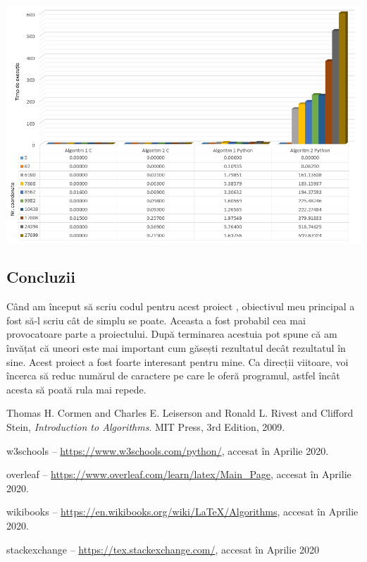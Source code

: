 \documentclass[11pt,a4paper]{article}
\begin{document}
\begin{center}
  \includegraphics[width=1\textwidth]{diagrama1.png} \\
\end{center}

    \subsection{Concluzii}
    Când am început să scriu codul pentru acest proiect , obiectivul meu principal a fost să-l scriu cât de simplu se poate. Aceasta a fost probabil cea mai provocatoare parte a proiectului. După terminarea acestuia pot spune că am învățat că uneori este mai important cum găsești rezultatul decât rezultatul în sine. Acest proiect a fost foarte interesant pentru mine. Ca direcții viitoare, voi  încerca să reduc numărul de caractere pe care le oferă programul, astfel încât acesta să poată rula mai repede.

\begin{thebibliography}{9}

	  Thomas H. Cormen and Charles E. Leiserson and Ronald L. Rivest and Clifford Stein,
	  \emph{Introduction to Algorithms}.
	  MIT Press,
	  3rd Edition,
	  2009.

     w3schools -- 
      \url{https://www.w3schools.com/python/}, 
     accesat în Aprilie 2020.
     
     overleaf --
     \url{https://www.overleaf.com/learn/latex/Main_Page},
     accesat în Aprilie 2020.
     
     wikibooks --
     \url{https://en.wikibooks.org/wiki/LaTeX/Algorithms}, 
     accesat în Aprilie 2020.
     
     stackexchange --
     \url{https://tex.stackexchange.com/},
     accesat în Aprilie 2020
     
\end{thebibliography}
\end{document}
